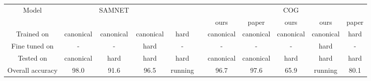 \begin{table}[t]
	\tiny
	
	\centering
	\begin{tabular}{ccccccccccc}
		\toprule
		Model & & SAMNET & && &&& COG& \\
		\cmidrule{2-5} \cmidrule{7-11} 
		&&&&&& ours & paper & ours & ours & paper\\
		\cmidrule{7-9} \cmidrule{10-11}
		Trained on       & canonical & canonical & canonical & hard &            & canonical &  canonical  & canonical  & canonical & hard \\ 
		Fine tuned on  & - & - & hard  & - &           &- & -   & - & hard & - \\ 
		Tested on        & canonical & hard & hard & hard &           & canonical  &  canonical  & hard & hard & hard  \\ 
		\midrule
		
		Overall accuracy & 98.0 & 91.6 & 96.5  & running &           & 96.7 & 97.6  & 65.9 & running& 80.1 \\ 
		
		\midrule 
		

\end{tabular}
\end{table}
